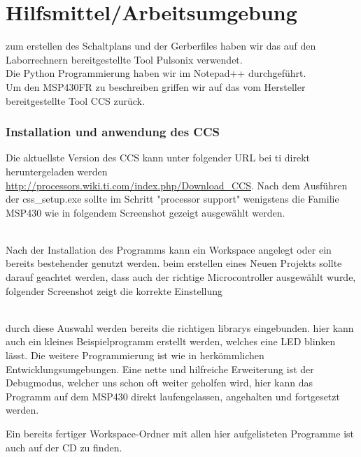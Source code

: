 %
\chapter{Hilfsmittel/Arbeitsumgebung}
\label{chap:arbeit}

zum erstellen des Schaltplans und der Gerberfiles haben wir das auf den Laborrechnern bereitgestellte Tool Pulsonix verwendet.\\
Die Python Programmierung haben wir im Notepad++ durchgeführt.\\
Um den MSP430FR zu beschreiben griffen wir auf das vom Hersteller bereitgestellte Tool CCS zurück.

\subsection{Installation und anwendung des CCS}
\raggedright
Die aktuellste Version des CCS kann unter folgender URL bei ti direkt heruntergeladen werden \url{http://processors.wiki.ti.com/index.php/Download_CCS}.
Nach dem Ausführen der css\_setup.exe sollte im Schritt "processor support" wenigstens die Familie MSP430 wie in folgendem Screenshot gezeigt ausgewählt werden.\\
	\centering
	\\
\raggedright	
Nach der Installation des Programms kann ein Workspace angelegt oder ein bereits bestehender genutzt werden.
beim erstellen eines Neuen Projekts sollte darauf geachtet werden, dass auch der richtige Microcontroller ausgewählt wurde, folgender Screenshot zeigt die korrekte Einstellung\\
	\centering
	\\
\raggedright	
durch diese Auswahl werden bereits die richtigen librarys eingebunden.
hier kann auch ein kleines Beispielprogramm erstellt werden, welches eine LED blinken lässt.
Die weitere Programmierung ist wie in herkömmlichen Entwicklungsumgebungen.
Eine nette und hilfreiche Erweiterung ist der Debugmodus, welcher uns schon oft weiter geholfen wird, hier kann das Programm auf dem MSP430 direkt laufengelassen, angehalten und fortgesetzt werden.



Ein bereits fertiger Workspace-Ordner mit allen hier aufgelisteten Programme ist auch auf der CD zu finden.